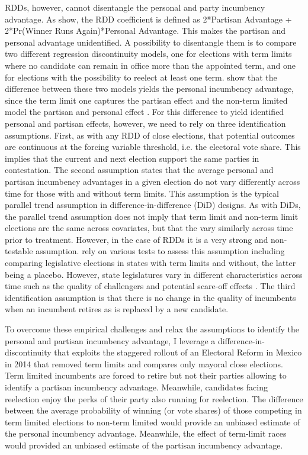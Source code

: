 \documentclass[12pt]{amsart}
\numberwithin{equation}{section}
\theoremstyle{definition}
\theoremstyle{definition}
\theoremstyle{definition}
\begin{document}
RDDs, however, cannot disentangle the personal and party incumbency advantage. As \citep{erikson_titiunik_2015} show, the RDD coefficient is defined as 2*Partisan Advantage + 2*Pr(Winner Runs Again)*Personal Advantage. This makes the partisan and personal advantage unidentified. A possibility to disentangle them is to compare two different regression discontinuity models, one for elections with term limits where no candidate can remain in office more than the appointed term, and one for elections with the possibility to reelect at least one term. \citet{fowler_hall_2014} show that the difference between these two models yields the personal incumbency advantage, since the term limit one captures the partisan effect and the non-term limited model the partisan and personal effect \citep{gelman_2011}. For this difference to yield identified personal and partisan effects, however, we need to rely on three identification assumptions. First, as with any RDD of close elections, that potential outcomes are continuous at the forcing variable threshold, i.e. the electoral vote share. This implies that the current and next election support the same parties in contestation. The second assumption states that the average personal and partisan incumbency advantages in a given election do not vary differently across time for those with and without term limits. This assumption is the typical parallel trend assumption in difference-in-difference (DiD) designs. As with DiDs, the parallel trend assumption does not imply that term limit and non-term limit elections are the same across covariates, but that the vary similarly across time prior to treatment. However, in the case of RDDs it is a very strong and non-testable assumption. \citet{fowler_hall_2014} rely on various tests to assess this assumption including comparing legislative elections in states with term limits and without, the latter being a placebo. However, state legislatures vary in different characteristics across time such as the quality of challengers and potential scare-off effects \citep{rogers_2014}. The third identification assumption is that there is no change in the quality of incumbents when an incumbent retires as is replaced by a new candidate. 
 
To overcome these empirical challenges and relax the  assumptions to identify the personal and partisan incumbency advantage, I leverage a difference-in-discontinuity that exploits the staggered rollout of an Electoral Reform in Mexico in 2014 that removed term limits and compares only mayoral close elections. Term limited incumbents are forced to retire but not their parties allowing to identify a partisan incumbency advantage. Meanwhile, candidates facing reelection enjoy the perks of their party also running for reelection. The difference between the average probability of winning (or vote shares) of those competing in term limited elections to non-term limited would provide an unbiased estimate of the personal incumbency advantage. Meanwhile, the effect of term-limit races would provided an unbiased estimate of the partisan incumbency advantage. 
\end{document}
